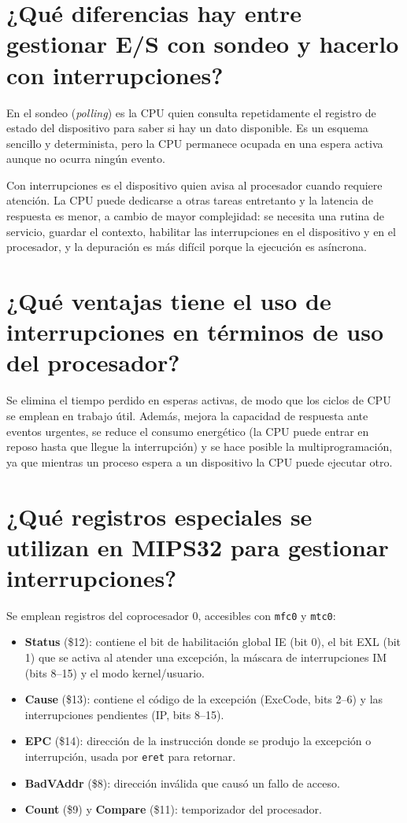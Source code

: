 \documentclass[11pt,a4paper]{article}
\begin{document}
\section{¿Qué diferencias hay entre gestionar E/S con sondeo y hacerlo con interrupciones?}

En el sondeo (\emph{polling}) es la CPU quien consulta repetidamente el registro de estado del dispositivo para saber si hay un dato disponible. Es un esquema sencillo y determinista, pero la CPU permanece ocupada en una espera activa aunque no ocurra ningún evento.

Con interrupciones es el dispositivo quien avisa al procesador cuando requiere atención. La CPU puede dedicarse a otras tareas entretanto y la latencia de respuesta es menor, a cambio de mayor complejidad: se necesita una rutina de servicio, guardar el contexto, habilitar las interrupciones en el dispositivo y en el procesador, y la depuración es más difícil porque la ejecución es asíncrona.

\section{¿Qué ventajas tiene el uso de interrupciones en términos de uso del procesador?}

Se elimina el tiempo perdido en esperas activas, de modo que los ciclos de CPU se emplean en trabajo útil. Además, mejora la capacidad de respuesta ante eventos urgentes, se reduce el consumo energético (la CPU puede entrar en reposo hasta que llegue la interrupción) y se hace posible la multiprogramación, ya que mientras un proceso espera a un dispositivo la CPU puede ejecutar otro.

\section{¿Qué registros especiales se utilizan en MIPS32 para gestionar interrupciones?}

Se emplean registros del coprocesador 0, accesibles con \texttt{mfc0} y \texttt{mtc0}:

\begin{itemize}[leftmargin=2em]
\item \textbf{Status} (\$12): contiene el bit de habilitación global IE (bit 0), el bit EXL (bit 1) que se activa al atender una excepción, la máscara de interrupciones IM (bits 8--15) y el modo kernel/usuario.
\item \textbf{Cause} (\$13): contiene el código de la excepción (ExcCode, bits 2--6) y las interrupciones pendientes (IP, bits 8--15).
\item \textbf{EPC} (\$14): dirección de la instrucción donde se produjo la excepción o interrupción, usada por \texttt{eret} para retornar.
\item \textbf{BadVAddr} (\$8): dirección inválida que causó un fallo de acceso.
\item \textbf{Count} (\$9) y \textbf{Compare} (\$11): temporizador del procesador.
\end{itemize}
\end{document}
